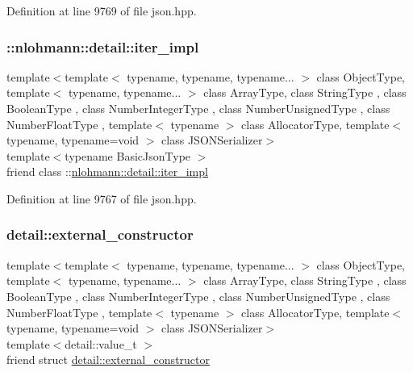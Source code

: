 Definition at line 9769 of file json.\+hpp.

\mbox{\label{classnlohmann_1_1basic__json_a842e5c7ca096025c18b11e715d3401f4}} 
\subsubsection{\texorpdfstring{\+::nlohmann\+::detail\+::iter\+\_\+impl}{::nlohmann::detail::iter\_impl}}
{\footnotesize\ttfamily template$<$template$<$ typename, typename, typename... $>$ class Object\+Type, template$<$ typename, typename... $>$ class Array\+Type, class String\+Type , class Boolean\+Type , class Number\+Integer\+Type , class Number\+Unsigned\+Type , class Number\+Float\+Type , template$<$ typename $>$ class Allocator\+Type, template$<$ typename, typename=void $>$ class J\+S\+O\+N\+Serializer$>$ \\
template$<$typename Basic\+Json\+Type $>$ \\
friend class \+::\hyperlink{classnlohmann_1_1detail_1_1iter__impl}{nlohmann\+::detail\+::iter\+\_\+impl}\hspace{0.3cm}{\ttfamily [friend]}}



Definition at line 9767 of file json.\+hpp.

\mbox{\label{classnlohmann_1_1basic__json_a6275ed57bae6866cdf5db5370a7ad47c}} 
\subsubsection{\texorpdfstring{detail\+::external\+\_\+constructor}{detail::external\_constructor}}
{\footnotesize\ttfamily template$<$template$<$ typename, typename, typename... $>$ class Object\+Type, template$<$ typename, typename... $>$ class Array\+Type, class String\+Type , class Boolean\+Type , class Number\+Integer\+Type , class Number\+Unsigned\+Type , class Number\+Float\+Type , template$<$ typename $>$ class Allocator\+Type, template$<$ typename, typename=void $>$ class J\+S\+O\+N\+Serializer$>$ \\
template$<$detail\+::value\+\_\+t $>$ \\
friend struct \hyperlink{structnlohmann_1_1detail_1_1external__constructor}{detail\+::external\+\_\+constructor}\hspace{0.3cm}{\ttfamily [friend]}}



